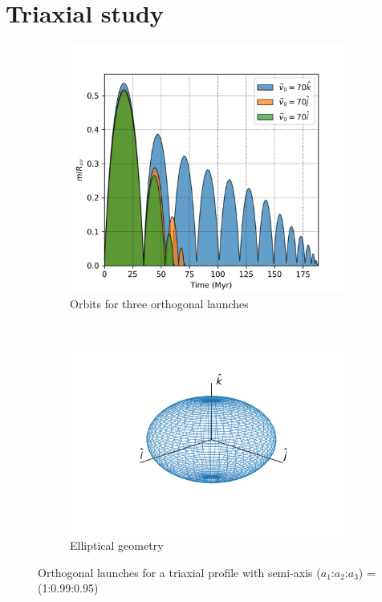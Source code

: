 	\section{Triaxial study}
	
	\begin{figure}[h]
		\centering
		\begin{subfigure}[b]{0.49\textwidth}
			\includegraphics[width = \textwidth]{"../Files/Week 7/orthogonal_triaxial"}
			\caption{Orbits for three orthogonal launches}
			\label{fig: orthogonalLaunches}
		\end{subfigure}
		~ 
		\begin{subfigure}[b]{0.49\textwidth}
			\includegraphics[width=\textwidth]{"../Files/Week 7/ellipsoid"}
			\caption{Elliptical geometry}
		\end{subfigure}
		\caption{Orthogonal launches for a triaxial profile with semi-axis ($a_1$:$a_2$:$a_3$) = (1:0.99:0.95)}
		\label{fig: mainOrthogonalLaunches}
	\end{figure}